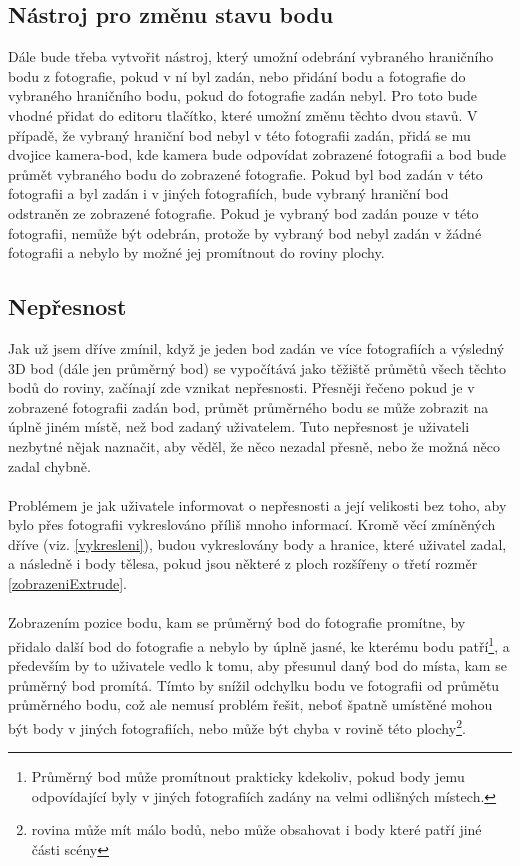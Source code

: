 \documentclass[11pt,twoside,a4paper]{book}
\begin{document}
\subsection{Nástroj pro změnu stavu bodu}
\label{fixaceBodu}
Dále bude třeba vytvořit nástroj, který umožní odebrání  vybraného hraničního bodu z fotografie, pokud v ní byl zadán, nebo přidání bodu a fotografie do vybraného hraničního bodu, pokud do fotografie zadán nebyl. Pro toto bude vhodné přidat do editoru tlačítko, které umožní změnu těchto dvou stavů. V případě, že vybraný hraniční bod nebyl v této fotografii zadán, přidá se mu dvojice kamera-bod, kde kamera bude odpovídat zobrazené fotografii a bod bude průmět vybraného bodu do zobrazené fotografie. Pokud byl bod zadán v této fotografii a byl zadán i v jiných fotografiích, bude vybraný hraniční bod odstraněn ze zobrazené fotografie. Pokud je vybraný bod zadán pouze v této fotografii, nemůže být odebrán, protože by vybraný bod nebyl zadán v žádné fotografii a nebylo by možné jej promítnout do roviny plochy. 

\subsection{Nepřesnost}
Jak už jsem dříve zmínil, když je jeden bod zadán ve více fotografiích a výsledný 3D bod (dále jen průměrný bod) se vypočítává jako těžiště průmětů všech těchto bodů do roviny, začínají zde vznikat nepřesnosti. Přesněji řečeno pokud je v zobrazené fotografii zadán bod, průmět průměrného bodu se může zobrazit na úplně jiném místě, než bod zadaný uživatelem. Tuto nepřesnost je uživateli nezbytné nějak naznačit, aby věděl, že něco nezadal přesně, nebo že možná něco zadal chybně.
\paragraph{}
Problémem je jak uživatele informovat o nepřesnosti a její velikosti bez toho, aby bylo přes fotografii vykreslováno příliš mnoho informací. Kromě věcí zmíněných dříve (viz. \ref{vykresleni}), budou vykreslovány body a hranice, které uživatel zadal, a následně i body tělesa, pokud jsou některé z ploch rozšířeny o třetí rozměr \ref{zobrazeniExtrude}.
\paragraph{}
Zobrazením pozice bodu, kam se průměrný bod do fotografie promítne, by přidalo další bod do fotografie a nebylo by úplně jasné, ke kterému bodu patří\footnote{Průměrný bod může promítnout prakticky kdekoliv, pokud body jemu odpovídající byly v jiných fotografiích zadány na velmi odlišných místech.}, a především by to uživatele vedlo k tomu, aby přesunul daný bod do místa, kam se průměrný bod promítá. Tímto by snížil odchylku bodu ve fotografii od průmětu průměrného bodu, což ale nemusí problém řešit, neboť špatně umístěné mohou být body v jiných fotografiích, nebo může být chyba v rovině této plochy\footnote{rovina může mít málo bodů, nebo může obsahovat i body které patří jiné části scény}. 
\end{document}
